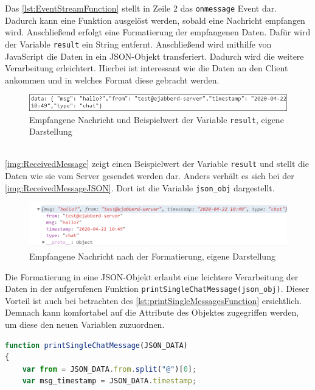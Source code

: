 \documentclass[a4paper,titlepage,halfparskip,12pt]{scrreprt}
\begin{document}
\begin{onehalfspacing}
Das \autoref{lst:EventStreamFunction} stellt in Zeile 2 das \texttt{onmessage} Event dar. Dadurch kann eine Funktion ausgelöst werden, sobald eine Nachricht empfangen wird. Anschließend erfolgt eine Formatierung der empfangenen Daten. Dafür wird der Variable \texttt{result} ein String entfernt. Anschließend wird mithilfe von JavaScript die Daten in ein JSON-Objekt transferiert. Dadurch wird die weitere Verarbeitung erleichtert. Hierbei ist interessant wie die Daten an den Client ankommen und in welches Format diese gebracht werden.
\begin{figure}[h]
	\centering
	\includegraphics[scale=1.2]{images/GochatAusgabeEmpfangenerNachrichtBearbeitet}
	\caption{Empfangene Nachricht und Beispielwert der Variable \texttt{result}, eigene Darstellung}
	\label{img:ReceivedMessage}
\end{figure}\\
\autoref{img:ReceivedMessage} zeigt einen Beispielwert der Variable \texttt{result} und stellt die Daten wie sie vom Server gesendet werden dar. Anders verhält es sich bei der \autoref{img:ReceivedMessageJSON}. Dort ist die Variable \texttt{json\_obj} dargestellt.
\begin{figure}[h]
	\centering
	\includegraphics[width=\textwidth]{images/GochatAusgabeEmpfangenerNachrichtJSONformat}
	\caption{Empfangene Nachricht nach der Formatierung, eigene Darstellung}
	\label{img:ReceivedMessageJSON}
\end{figure}
Die Formatierung in eine JSON-Objekt erlaubt eine leichtere Verarbeitung der Daten in der aufgerufenen Funktion \texttt{printSingleChatMessage(json\_obj)}. %
Dieser Vorteil ist auch bei betrachten des \autoref{lst:printSingleMessagesFunction} ersichtlich. Demnach kann komfortabel auf die Attribute des Objektes zugegriffen werden, um diese den neuen Variablen zuzuordnen. 
\begin{lstlisting}[language=Javascript,caption=Funktion und Datenverarbeitung des JSON-Objektes ,label={lst:printSingleMessagesFunction}]
function printSingleChatMessage(JSON_DATA)
{
	var from = JSON_DATA.from.split("@")[0];
	var msg_timestamp = JSON_DATA.timestamp;

\end{lstlisting}
\end{onehalfspacing}
\end{document}

